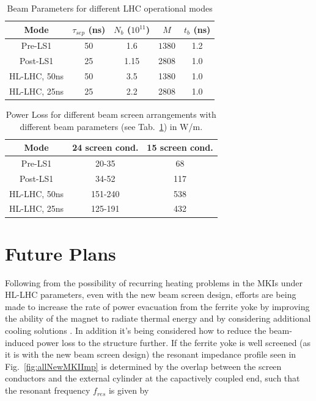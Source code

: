 \documentclass[a4paper,
              ]{jacow}
\begin{document}
\begin{table}
\caption{Beam Parameters for different LHC operational modes}
\label{tab:beamPara}
\begin{center}
\begin{tabular}{c | c | c | c | c}
Mode & $\tau_{sep}$ (ns) & $N_{b}$ ($10^{11}$) & $ M $ & $t_{b}$ (ns) \\ \hline 
Pre-LS1 & 50 & 1.6 & $ 1380 $ & 1.2 \\ \hline 
Post-LS1 & 25 & 1.15 & 2808 & 1.0 \\ \hline 
HL-LHC, 50ns & 50 & 3.5 & 1380 & 1.0 \\ \hline 
HL-LHC, 25ns & 25 & 2.2 & 2808 & 1.0 \\ 
\end{tabular}
\end{center}
\end{table}

\begin{table}
\caption{Power Loss for different beam screen arrangements with different beam parameters (see Tab.~\ref{tab:beamPara}) in W/m.}
\label{tab:powLoss}
\begin{center}
\begin{tabular}{c | c | c}
Mode & 24 screen cond. & 15 screen cond. \\ \hline 
Pre-LS1 & 20-35 & 68 \\ \hline 
Post-LS1 & 34-52 & 117 \\ \hline 
HL-LHC, 50ns & 151-240 & 538  \\ \hline 
HL-LHC, 25ns & 125-191 & 432  \\ 
\end{tabular}
\end{center}
\end{table}

\section{Future Plans}

Following from the possibility of recurring heating problems in the MKIs under HL-LHC parameters, even with the new beam screen design, efforts are being made to increase the rate of power evacuation from the ferrite yoke by improving the ability of the magnet to radiate thermal energy and by considering additional cooling solutions \cite{mkiCoolling}. In addition it's being considered how to reduce the beam-induced power loss to the structure further. If the ferrite yoke is well screened (as it is with the new beam screen design) the resonant impedance profile seen in Fig.~\ref{fig:allNewMKIImp} is determined by the overlap between the screen conductors and the external cylinder at the capactively coupled end, such that the resonant frequency $f_{res}$ is given by
\end{document}
